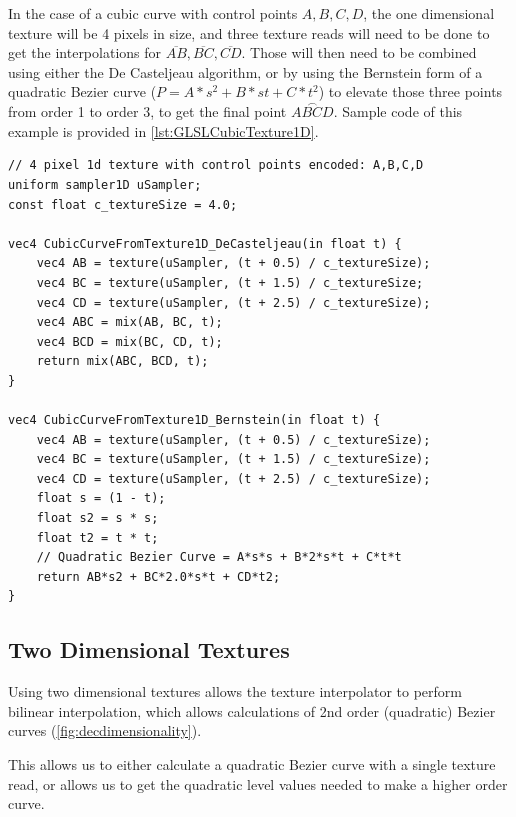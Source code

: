\documentclass{jcgt}
\begin{document}
In the case of a cubic curve with control points $A,B,C,D$, the one dimensional texture will be 4 pixels in size, and three texture reads will need to be done to get the interpolations for $\overline{AB},\overline{BC},\overline{CD}$.  Those will then need to be combined using either the De Casteljeau algorithm, or by using the Bernstein form of a quadratic Bezier curve ($P = A*s^2 + B*st + C*t^2$) to elevate those three points from order 1 to order 3, to get the final point $\stackrel{\frown}{ABCD}$.  Sample code of this example is provided in \autoref{lst:GLSLCubicTexture1D}.

\begin{lstlisting}[caption={GLSL for evaluating a cubic curve encoded in a 4 pixel 1d texture.  Linear texture sampling is used to evaluate the linear level of the De Casteljeau algorithm, then the process is continued both with the De Casteljeau algorithm, as well as the Bernstein form of a quadratic Bezier curve.}, label={lst:GLSLCubicTexture1D}]
// 4 pixel 1d texture with control points encoded: A,B,C,D
uniform sampler1D uSampler; 
const float c_textureSize = 4.0;

vec4 CubicCurveFromTexture1D_DeCasteljeau(in float t) {
    vec4 AB = texture(uSampler, (t + 0.5) / c_textureSize);
    vec4 BC = texture(uSampler, (t + 1.5) / c_textureSize;
    vec4 CD = texture(uSampler, (t + 2.5) / c_textureSize);
    vec4 ABC = mix(AB, BC, t);
    vec4 BCD = mix(BC, CD, t);
    return mix(ABC, BCD, t);
}

vec4 CubicCurveFromTexture1D_Bernstein(in float t) {
    vec4 AB = texture(uSampler, (t + 0.5) / c_textureSize);
    vec4 BC = texture(uSampler, (t + 1.5) / c_textureSize);
    vec4 CD = texture(uSampler, (t + 2.5) / c_textureSize);
    float s = (1 - t);
    float s2 = s * s;
    float t2 = t * t;
    // Quadratic Bezier Curve = A*s*s + B*2*s*t + C*t*t
    return AB*s2 + BC*2.0*s*t + CD*t2;
}
\end{lstlisting}

\subsection{Two Dimensional Textures}
Using two dimensional textures allows the texture interpolator to perform bilinear interpolation, which allows calculations of 2nd order (quadratic) Bezier curves (\autoref{fig:decdimensionality}).

This allows us to either calculate a quadratic Bezier curve with a single texture read, or allows us to get the quadratic level values needed to make a higher order curve.
\end{document}
